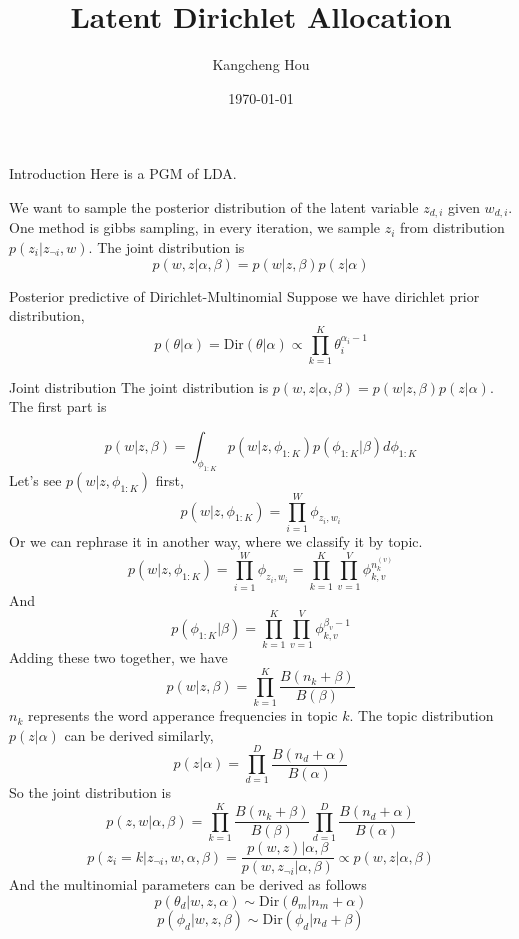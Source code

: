 \documentclass{beamer}
\title{Latent Dirichlet Allocation}
\author{Kangcheng Hou}
\institute{Zhejiang University}
\date{\today}
\begin{document}
    
\frame{\titlepage}

\begin{frame}{Introduction}
Here is a PGM of LDA.

We want to sample the posterior distribution of the latent variable $z_{d,i}$ given $w_{d,i}$. One method is gibbs sampling, in every iteration, we sample $z_i$ from distribution $p(z_i | z_{\neg i}, w)$.
The joint distribution is 
$$p(w,z | \alpha, \beta) = p(w | z, \beta) p(z | \alpha)$$
\end{frame}
\begin{frame}{Posterior predictive of Dirichlet-Multinomial}
Suppose we have dirichlet prior distribution,
$$p(\theta | \alpha) = \text{Dir}(\theta | \alpha) \propto \prod_{k=1}^K \theta_i^{\alpha_i - 1}$$

\end{frame}
\begin{frame}[allowframebreaks]{Joint distribution}
The joint distribution is $p(w,z | \alpha, \beta) = p(w | z, \beta) p(z | \alpha)$. The first part is

$$p(w | z, \beta) = \int_{\phi_{1 : K}} p(w | z, \phi_{1 : K})p(\phi_{1 : K} | \beta)d \phi_{1 :K}$$
Let's see $p(w | z, \phi_{1 : K})$ first, 
$$p(w | z, \phi_{1 : K}) = \prod_{i=1}^W \phi_{z_i, w_i}$$
Or we can rephrase it in another way, where we classify it by topic.
$$p(w | z, \phi_{1 : K}) = \prod_{i=1}^W \phi_{z_i, w_i} = \prod_{k=1}^K \prod_{v=1}^V \phi_{k,v}^{n_k^{(v)}}$$
And $$p(\phi_{1 : K} | \beta) = \prod_{k=1}^K \prod_{v=1}^V \phi_{k,v}^{\beta_v - 1} $$
Adding these two together, we have
$$p(w | z, \beta) = \prod_{k=1}^K \frac{B(n_k + \beta)}{B(\beta)}$$
$n_k$ represents the word apperance frequencies in topic $k$.
The topic distribution $p(z | \alpha)$ can be derived similarly,
$$p(z | \alpha) = \prod_{d=1}^D\frac{B(n_d + \alpha)}{B(\alpha)}$$
So the joint distribution is
$$p(z,w | \alpha, \beta) = \prod_{k=1}^K \frac{B(n_k + \beta)}{B(\beta)}\prod_{d=1}^D\frac{B(n_d + \alpha)}{B(\alpha)}$$
$$p(z_i = k | z_{\neg i}, w, \alpha, \beta) = \frac{p(w,z) | \alpha, \beta}{p(w, z_{\neg i} | \alpha, \beta)} \propto p(w,z | \alpha, \beta) $$
And the multinomial parameters can be derived as follows
$$p(\theta_d | w, z, \alpha) \sim \text{Dir}(\theta_m | n_m + \alpha)$$
$$p(\phi_d | w, z, \beta) \sim \text{Dir}(\phi_d | n_d + \beta) $$
\end{frame}
\end{document}
